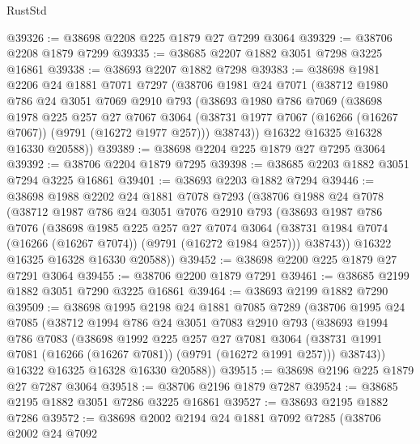 \begin{lexlean}{RustStd}
\begin{coremodule}
@39326 := @38698 @2208 @225 @1879 @27 @7299 @3064
@39329 := @38706 @2208 @1879 @7299
@39335 := @38685 @2207 @1882 @3051 @7298 @3225 @16861
@39338 := @38693 @2207 @1882 @7298
@39383 := @38698
    @1981
    @2206
    @24
    @1881
    @7071
    @7297
    (@38706
      @1981
      @24
      @7071
      (@38712
        @1980
        @786
        @24
        @3051
        @7069
        @2910
        @793
        (@38693
          @1980
          @786
          @7069
          (@38698
            @1978
            @225
            @257
            @27
            @7067
            @3064
            (@38731 @1977 @7067 (@16266 (@16267 @7067)) (@9791 (@16272 @1977 @257)))
            @38743))
        @16322
        @16325
        @16328
        @16330
        @20588))
@39389 := @38698 @2204 @225 @1879 @27 @7295 @3064
@39392 := @38706 @2204 @1879 @7295
@39398 := @38685 @2203 @1882 @3051 @7294 @3225 @16861
@39401 := @38693 @2203 @1882 @7294
@39446 := @38698
    @1988
    @2202
    @24
    @1881
    @7078
    @7293
    (@38706
      @1988
      @24
      @7078
      (@38712
        @1987
        @786
        @24
        @3051
        @7076
        @2910
        @793
        (@38693
          @1987
          @786
          @7076
          (@38698
            @1985
            @225
            @257
            @27
            @7074
            @3064
            (@38731 @1984 @7074 (@16266 (@16267 @7074)) (@9791 (@16272 @1984 @257)))
            @38743))
        @16322
        @16325
        @16328
        @16330
        @20588))
@39452 := @38698 @2200 @225 @1879 @27 @7291 @3064
@39455 := @38706 @2200 @1879 @7291
@39461 := @38685 @2199 @1882 @3051 @7290 @3225 @16861
@39464 := @38693 @2199 @1882 @7290
@39509 := @38698
    @1995
    @2198
    @24
    @1881
    @7085
    @7289
    (@38706
      @1995
      @24
      @7085
      (@38712
        @1994
        @786
        @24
        @3051
        @7083
        @2910
        @793
        (@38693
          @1994
          @786
          @7083
          (@38698
            @1992
            @225
            @257
            @27
            @7081
            @3064
            (@38731 @1991 @7081 (@16266 (@16267 @7081)) (@9791 (@16272 @1991 @257)))
            @38743))
        @16322
        @16325
        @16328
        @16330
        @20588))
@39515 := @38698 @2196 @225 @1879 @27 @7287 @3064
@39518 := @38706 @2196 @1879 @7287
@39524 := @38685 @2195 @1882 @3051 @7286 @3225 @16861
@39527 := @38693 @2195 @1882 @7286
@39572 := @38698
    @2002
    @2194
    @24
    @1881
    @7092
    @7285
    (@38706
      @2002
      @24
      @7092

\end{coremodule}
\end{lexlean}
